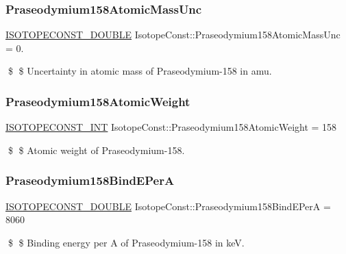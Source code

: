 \subsubsection{\texorpdfstring{Praseodymium158\+Atomic\+Mass\+Unc}{Praseodymium158AtomicMassUnc}}
{\footnotesize\ttfamily \mbox{\hyperlink{group___isotope_const-_macros_ga8f45a7272ce02c0b4c65c44636ed719a}{I\+S\+O\+T\+O\+P\+E\+C\+O\+N\+S\+T\+\_\+\+D\+O\+U\+B\+LE}} Isotope\+Const\+::\+Praseodymium158\+Atomic\+Mass\+Unc = 0.}

\$ \$ Uncertainty in atomic mass of Praseodymium-\/158 in amu. \mbox{\label{group___isotope_const-_praseodymium-_pr158_gad89468ec95b27f1875fb2e4d13703aa6}} 
\subsubsection{\texorpdfstring{Praseodymium158\+Atomic\+Weight}{Praseodymium158AtomicWeight}}
{\footnotesize\ttfamily \mbox{\hyperlink{group___isotope_const-_macros_ga5f18360b3e99483a35c32d789e62621c}{I\+S\+O\+T\+O\+P\+E\+C\+O\+N\+S\+T\+\_\+\+I\+NT}} Isotope\+Const\+::\+Praseodymium158\+Atomic\+Weight = 158}

\$ \$ Atomic weight of Praseodymium-\/158. \mbox{\label{group___isotope_const-_praseodymium-_pr158_ga3a7508f0f6b46cd64999b101e97328ec}} 
\subsubsection{\texorpdfstring{Praseodymium158\+Bind\+E\+PerA}{Praseodymium158BindEPerA}}
{\footnotesize\ttfamily \mbox{\hyperlink{group___isotope_const-_macros_ga8f45a7272ce02c0b4c65c44636ed719a}{I\+S\+O\+T\+O\+P\+E\+C\+O\+N\+S\+T\+\_\+\+D\+O\+U\+B\+LE}} Isotope\+Const\+::\+Praseodymium158\+Bind\+E\+PerA = 8060}

\$ \$ Binding energy per A of Praseodymium-\/158 in keV. \mbox{\label{group___isotope_const-_praseodymium-_pr158_gac2b1e20cb97d482188acdd5f0bf3426a}} 
